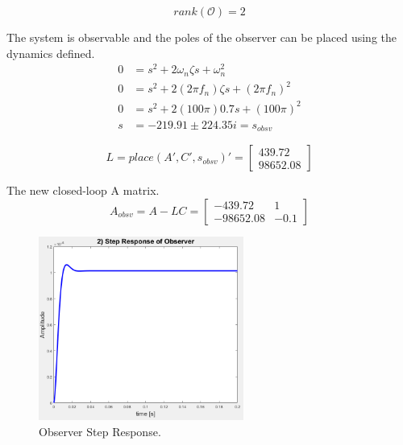 \documentclass[11pt]{article}
\begin{document}
\begin{enumerate}[label=\textbf{\arabic*.}]
  \begin{equation}
    rank(\mathcal{O}) = 2
  \end{equation}

  The system is observable and the poles of the observer can be placed using the 
  dynamics defined.
  \begin{equation}
    \begin{split}
      0 &= s^2 + 2 \omega_n \zeta s + \omega_n^2 \\
      0 &= s^2 + 2 (2 \pi f_n) \zeta s + (2 \pi f_n)^2 \\
      0 &= s^2 + 2 (100 \pi) 0.7 s + (100 \pi)^2 \\
      s &= -219.91 \pm 224.35i = s_{obsv}
    \end{split}
  \end{equation}

  \begin{equation}
    L = place(A', C', s_{obsv})' =
    \begin{bmatrix}
      439.72 \\ 98652.08
    \end{bmatrix}
  \end{equation}

  The new closed-loop A matrix.
  \begin{equation}
    A_{obsv} = A-LC =
    \begin{bmatrix}
      -439.72 & 1 \\ -98652.08 & -0.1
    \end{bmatrix}
  \end{equation}

  \begin{figure}[H]
    \centering
    \includegraphics[width=0.6\textwidth]{p2.png}
    \caption{Observer Step Response.}
  \end{figure}


\end{enumerate}
\end{document}
